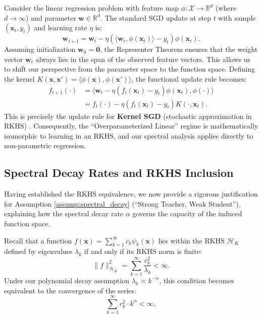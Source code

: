 \documentclass{article}
\theoremstyle{definition}
\theoremstyle{definition}
\theoremstyle{plain}
\theoremstyle{plain}
\theoremstyle{plain}
\theoremstyle{plain}
\theoremstyle{plain}
\begin{document}
Consider the linear regression problem with feature map $\phi: \mathcal{X} \to \mathbb{R}^d$ (where $d \to \infty$) and parameter $\mathbf{w} \in \mathbb{R}^d$. The standard SGD update at step $t$ with sample $(\mathbf{x}_t, y_t)$ and learning rate $\eta$ is:
\begin{equation}
    \mathbf{w}_{t+1} = \mathbf{w}_t - \eta \left( \langle \mathbf{w}_t, \phi(\mathbf{x}_t) \rangle - y_t \right) \phi(\mathbf{x}_t).
\end{equation}
Assuming initialization $\mathbf{w}_0 = \mathbf{0}$, the Representer Theorem ensures that the weight vector $\mathbf{w}_t$ always lies in the span of the observed feature vectors. This allows us to shift our perspective from the parameter space to the function space. Defining the kernel $K(\mathbf{x}, \mathbf{x}') = \langle \phi(\mathbf{x}), \phi(\mathbf{x}') \rangle$, the functional update rule becomes:
\begin{align}
    f_{t+1}(\cdot) &= \langle \mathbf{w}_t - \eta (f_t(\mathbf{x}_t) - y_t) \phi(\mathbf{x}_t), \phi(\cdot) \rangle \nonumber \\
    &= f_t(\cdot) - \eta (f_t(\mathbf{x}_t) - y_t) K(\cdot, \mathbf{x}_t).
    \label{eq:kernel_sgd_update}
\end{align}
This is precisely the update rule for \textbf{Kernel SGD} (stochastic approximation in RKHS) \citep{dieuleveut2016nonparametricstochasticapproximationlarge}. Consequently, the ``Overparameterized Linear'' regime is mathematically isomorphic to learning in an RKHS, and our spectral analysis applies directly to non-parametric regression.

\subsection{Spectral Decay Rates and RKHS Inclusion}
\label{app:sub:rkhs_capacity}

Having established the RKHS equivalence, we now provide a rigorous justification for Assumption \ref{assump:spectral_decay} (``Strong Teacher, Weak Student''), explaining how the spectral decay rate $\alpha$ governs the capacity of the induced function space.

Recall that a function $f(\mathbf{x}) = \sum_{k=1}^\infty c_k \psi_k(\mathbf{x})$ lies within the RKHS $\mathcal{H}_K$ defined by eigenvalues $\lambda_k$ if and only if its RKHS norm is finite: 
\begin{equation}
    \|f\|_{\mathcal{H}_K}^2 = \sum_{k=1}^\infty \frac{c_k^2}{\lambda_k} < \infty.
\end{equation}
Under our polynomial decay assumption $\lambda_k \asymp k^{-\alpha}$, this condition becomes equivalent to the convergence of the series:
\begin{equation}
    \sum_{k=1}^\infty c_k^2 \cdot k^{\alpha} < \infty,
    \label{eq:smoothness_condition}
\end{equation}
\end{document}
